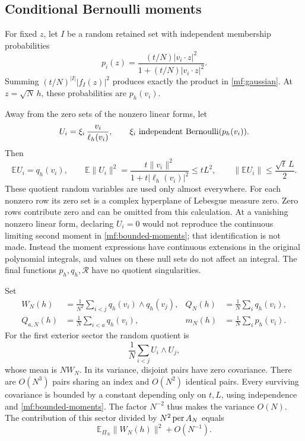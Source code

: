 \subsection{Conditional Bernoulli moments}

For fixed \(z\), let \(I\) be a random retained set with independent
membership probabilities
\[
 p_i(z)=
 \frac{(t/N)|v_i\cdot z|^2}{1+(t/N)|v_i\cdot z|^2}.
\]
Summing \((t/N)^{|I|}|f_I(z)|^2\) produces exactly the product in
\eqref{mf:gaussian}. At \(z=\sqrt N\,h\), these probabilities are
\(p_h(v_i)\).

Away from the zero sets of the nonzero linear forms, let
\[
 U_i=\xi_i\,\frac{v_i}{\ell_h(v_i)},\qquad
 \xi_i\ \hbox{independent Bernoulli}(p_h(v_i)).
\]
Then
\begin{equation}\label{mf:bounded-moments}
 \mathbb E U_i=q_h(v_i),\qquad
 \mathbb E\|U_i\|^2
 =\frac{t\|v_i\|^2}{1+t|\ell_h(v_i)|^2}\le tL^2,\qquad
 \|\mathbb E U_i\|\le\frac{\sqrt t\,L}{2}.
\end{equation}
These quotient random variables are used only almost everywhere.
For each nonzero row its zero set is a complex hyperplane of Lebesgue
measure zero. Zero rows contribute zero and can be omitted from this
calculation. At a vanishing nonzero linear form, declaring \(U_i=0\)
would not reproduce the continuous limiting second moment in
\eqref{mf:bounded-moments}; that identification is not made.
Instead the moment expressions have continuous extensions in the original
polynomial integrals, and values on these null sets do not affect an
integral. The final functions \(p_h,q_h,\mathcal R\) have no quotient
singularities.

Set
\begin{align*}
 W_N(h)&=\frac1{N^2}\sum_{i<j}q_h(v_i)\wedge q_h(v_j),
 &Q_N(h)&=\frac1N\sum_iq_h(v_i),\\
 Q_{a,N}(h)&=\frac1N\sum_{i<a}q_h(v_i),
 &m_N(h)&=\frac1N\sum_ip_h(v_i).
\end{align*}
For the first exterior sector the random quotient is
\[
 \frac1N\sum_{i<j}U_i\wedge U_j,
\]
whose mean is \(NW_N\). In its variance, disjoint pairs have zero
covariance. There are \(O(N^3)\) pairs sharing an index and \(O(N^2)\)
identical pairs. Every surviving covariance is bounded by a constant
depending only on \(t,L\), using independence and
\eqref{mf:bounded-moments}. The factor \(N^{-2}\) thus makes the variance
\(O(N)\). The contribution of this sector divided by \(N^2\operatorname{per} A_N\)
equals
\begin{equation}\label{mf:first-sector-limit}
 \mathbb E_{\Pi_N}\|W_N(h)\|^2+O(N^{-1}).
\end{equation}

